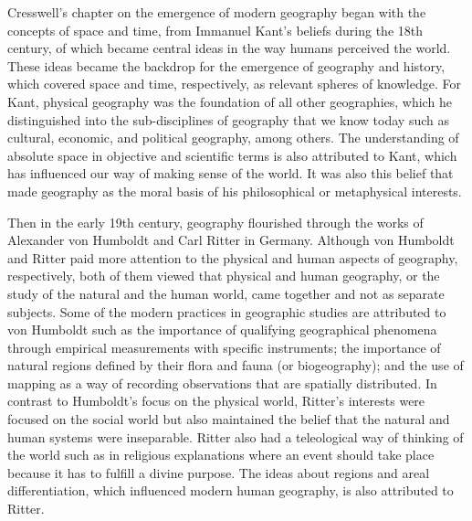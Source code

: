 \documentclass[a4paper, 10.5pt]{article} %
\begin{document}
Cresswell's chapter on the emergence of modern geography began with the concepts of space and time, from Immanuel Kant's beliefs during the 18th century, of which became central ideas in the way humans perceived the world. These ideas became the backdrop for the emergence of geography and history, which covered space and time, respectively, as relevant spheres of knowledge. For Kant, physical geography was the foundation of all other geographies, which he distinguished into the sub-disciplines of geography that we know today such as cultural, economic, and political geography, among others. The understanding of absolute space in objective and scientific terms is also attributed to Kant, which has influenced our way of making sense of the world. It was also this belief that made geography as the moral basis of his philosophical or metaphysical interests.

Then in the early 19th century, geography flourished through the works of Alexander von Humboldt and Carl Ritter in Germany. Although von Humboldt and Ritter paid more attention to the physical and human aspects of geography, respectively, both of them viewed that physical and human geography, or the study of the natural and the human world, came together and not as separate subjects. Some of the modern practices in geographic studies are attributed to von Humboldt such as the importance of qualifying geographical phenomena through empirical measurements with specific instruments; the importance of natural regions defined by their flora and fauna (or biogeography); and the use of mapping as a way of recording observations that are spatially distributed. In contrast to Humboldt's focus on the physical world, Ritter's interests were focused on the social world but also maintained the belief that the natural and human systems were inseparable. Ritter also had a teleological way of thinking of the world such as in religious explanations where an event should take place because it has to fulfill a divine purpose. The ideas about regions and areal differentiation, which influenced modern human geography, is also attributed to Ritter.
\end{document}
